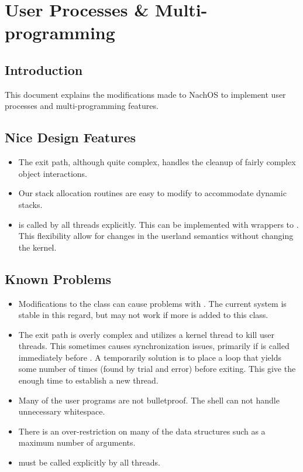   \chapter{User Processes \& Multi-programming}
  \section{Introduction}
    This document explains the modifications made to NachOS to implement user
    processes and multi-programming features.
  
  \section{Nice Design Features}
    \begin{itemize}
      \item The exit path, although quite complex, handles the cleanup of fairly complex
	object interactions.
      
      \item Our stack allocation routines are easy to modify to accommodate dynamic
	stacks.
      
      \item {} is called by all threads explicitly. This can be
	implemented with wrappers to . This flexibility allow for changes in
	the userland  semantics without changing the kernel.
    \end{itemize}

  \section{Known Problems}
  \label{xref:knownproblems}
    \begin{itemize}
      \item Modifications to the  class can cause problems with
	. The current system is stable in this regard, but may not work if
	more is added to this class.
      
      \item The exit path is overly complex and utilizes a kernel thread to kill user
	threads. This sometimes causes synchronization issues, primarily if 
	is called immediately before . A temporarily solution is to place a
	 loop that yields some number of times (found by trial and
	error) before exiting. This give the  enough time to establish a new
	thread.
      
      \item Many of the user programs are not bulletproof. The shell can not handle
	unnecessary whitespace.
	  
      \item There is an over-restriction on many of the  data structures
	such as a maximum number of arguments.
      
      \item {} must be called explicitly by all threads.
    \end{itemize}
  
